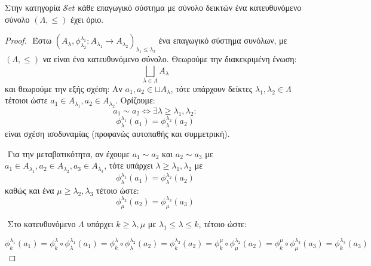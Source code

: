 \vspace*{0.3cm}

\begin{theorem} Στην κατηγορία $\mathcal{S}et$ κάθε επαγωγικό σύστημα με σύνολο δεικτών ένα κατευθυνόμενο σύνολο $(\Lambda,\leq)$ έχει όριο.
\end{theorem}

\begin{proof}
    $ $\newline
    Έστω $(A_{\lambda},\phi^{\lambda_1}_{\lambda_2}:A_{\lambda_1}\rightarrow A_{\lambda_2})_{\lambda_1 \leq \lambda_2}$ ένα επαγωγικό σύστημα συνόλων, με $(\Lambda,\leq)$ να είναι ένα κατευθυνόμενο σύνολο. Θεωρούμε την διακεκριμένη ένωση:
    $$\bigsqcup\limits_{\lambda \in \Lambda}A_{\lambda}$$ και θεωρούμε την εξής σχέση: Αν $a_1,a_2 \in \sqcup A_{\lambda}$, τότε υπάρχουν δείκτες $\lambda_1,\lambda_2 \in \Lambda$ τέτοιοι ώστε $a_1 \in A_{\lambda_1}, a_2 \in A_{\lambda_2}$. Ορίζουμε:
    $$a_1 \sim a_2 \iff \exists \lambda \geq \lambda_1,\lambda_2:$$
    $$\phi^{\lambda_1}_{\lambda}(a_1)  = \phi^{\lambda_2}_{\lambda}(a_2)$$ είναι σχέση ισοδυναμίας (προφανώς αυτοπαθής και συμμετρική).

    $ $\newline %
    Για την μεταβατικότητα, αν έχουμε $a_1 \sim a_2$ και $a_2 \sim a_3$ με $a_1 \in A_{\lambda_1},a_2 \in A_{\lambda_2},a_3 \in A_{\lambda_3}$,
    τότε υπάρχει $\lambda \geq \lambda_1,\lambda_2$ με 
    $$\phi^{\lambda_1}_{\lambda}(a_1)  = \phi^{\lambda_2}_{\lambda}(a_2)$$ καθώς και ένα $\mu \geq \lambda_2,\lambda_3$ τέτοιο ώστε:
    $$\phi^{\lambda_2}_{\mu}(a_2)  = \phi^{\lambda_3}_{\mu}(a_3)$$ 

    $ $\newline
    Στο κατευθυνόμενο $\Lambda$ υπάρχει $k\geq \lambda, \mu$ με $\lambda_1\leq \lambda \leq k$, τέτοιο ώστε:
    \begin{figure}[H]
        \centering
    \end{figure}
    $$\phi^{\lambda_1}_k (a_1)= \phi^{\lambda}_k \circ \phi^{\lambda_1}_{\lambda}(a_1) = \phi^{\lambda}_{k} \circ \phi^{\lambda_2}_{\lambda}(a_2) = \phi^{\lambda_2}_k (a_2) = \phi^{\mu}_k \circ \phi^{\lambda_2}_{\mu} (a_2)= \phi^{\mu}_k \circ \phi^{\lambda_3}_{\mu} (a_3) = \phi^{\lambda_3}_k (a_3)$$ 


\end{proof}
